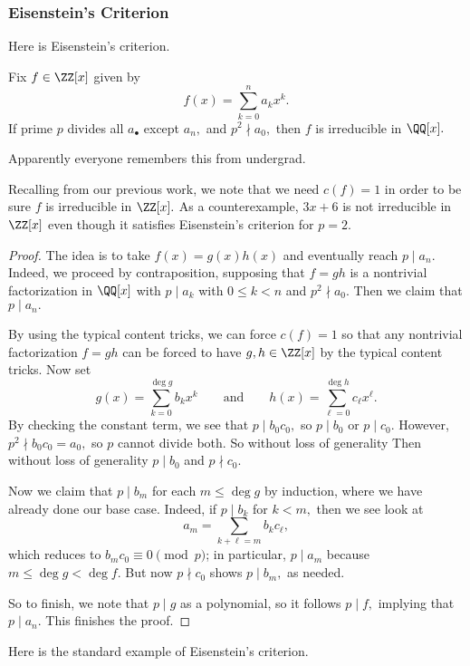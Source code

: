 \subsubsection{Eisenstein's Criterion}
Here is Eisenstein's criterion.
\begin{proposition}[Eisenstein]
	Fix $f\in\ZZ[x]$ given by
	\[f(x)=\sum_{k=0}^na_kx^k.\]
	If prime $p$ divides all $a_\bullet$ except $a_n,$ and $p^2\nmid a_0,$ then $f$ is irreducible in $\QQ[x].$
\end{proposition}
\begin{remark}
	Apparently everyone remembers this from undergrad.
\end{remark}
\begin{remark}[Nir]
	Recalling from our previous work, we note that we need $c(f)=1$ in order to be sure $f$ is irreducible in $\ZZ[x].$ As a counterexample, $3x+6$ is not irreducible in $\ZZ[x]$ even though it satisfies Eisenstein's criterion for $p=2.$
\end{remark}
\begin{proof}
	The idea is to take $f(x)=g(x)h(x)$ and eventually reach $p\mid a_n.$ Indeed, we proceed by contraposition, supposing that $f=gh$ is a nontrivial factorization in $\QQ[x]$ with $p\mid a_k$ with $0\le k<n$ and $p^2\nmid a_0.$ Then we claim that $p\mid a_n.$
	
	By using the typical content tricks, we can force $c(f)=1$ so that any nontrivial factorization $f=gh$ can be forced to have $g,h\in\ZZ[x]$ by the typical content tricks. Now set
	\[g(x)=\sum_{k=0}^{\deg g} b_kx^k\qquad\text{and}\qquad h(x)=\sum_{\ell=0}^{\deg h} c_\ell x^\ell.\]
	By checking the constant term, we see that $p\mid b_0c_0,$ so $p\mid b_0$ or $p\mid c_0.$ However, $p^2\nmid b_0c_0=a_0,$ so $p$ cannot divide both. So without loss of generality Then without loss of generality $p\mid b_0$ and $p\nmid c_0.$
	
	Now we claim that $p\mid b_m$ for each $m\le\deg g$ by induction, where we have already done our base case. Indeed, if $p\mid b_k$ for $k<m,$ then we see look at
	\[a_m=\sum_{k+\ell=m}b_kc_\ell,\]
	which reduces to $b_mc_0\equiv0\pmod p$; in particular, $p\mid a_m$ because $m\le\deg g<\deg f.$ But now $p\nmid c_0$ shows $p\mid b_m,$ as needed.

	So to finish, we note that $p\mid g$ as a polynomial, so it follows $p\mid f,$ implying that $p\mid a_n.$ This finishes the proof.
\end{proof}
Here is the standard example of Eisenstein's criterion.
